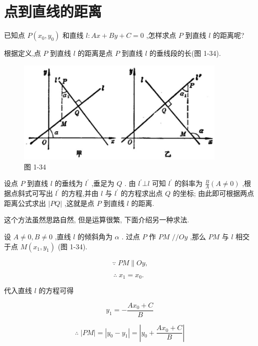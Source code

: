 \documentclass[lang=cn,newtx,10pt,scheme=chinese]{elegantbook}
\begin{document}
\section{点到直线的距离}

已知点 \(P\left( {{x}_{0},{y}_{0}}\right)\) 和直线 \(l : {Ax} + {By} + C = 0\) ,怎样求点 \(P\) 到直线 \(l\) 的距离呢?

根据定义,点 \(P\) 到直线 \(l\) 的距离是点 \(P\) 到直线 \(l\) 的垂线段的长(图 1-34).

\begin{figure}[h]
  \centering
  \includegraphics[max width=0.9\textwidth]{images/01912cc2-ffb6-728e-9ae7-b113ff05c64b_54_863018.jpg}
  \caption{图 1-34}
\end{figure}



设点 \(P\) 到直线 \(l\) 的垂线为 \({l}^{\prime }\) ,垂足为 \(Q\) . 由 \({l}^{\prime } \bot l\) 可知 \({l}^{\prime }\) 的斜率为 \(\frac{B}{A}\left( {A \neq 0}\right)\) ,根据点斜式可写出 \({l}^{\prime }\) 的方程,并由 \(l\) 与 \({l}^{\prime }\) 的方程求出点 \(Q\) 的坐标; 由此即可根据两点距离公式求出 \(\left| {PQ}\right|\) ,这就是点 \(P\) 到直线 \(l\) 的距离.

这个方法虽然思路自然, 但是运算很繁, 下面介绍另一种求法.

设 \(A \neq 0,B \neq 0\) ,直线 \(l\) 的倾斜角为 \(\alpha\) . 过点 \(P\) 作 \({PM}\) \(//{Oy}\) ,那么 \({PM}\) 与 \(l\) 相交于点 \(M\left( {{x}_{1},{y}_{1}}\right)\) (图 1-34).

\[
  \because \;{PM}\parallel {Oy}\text{,}
\]

\[
  \therefore \;{x}_{1} = {x}_{0}\text{. }
\]

代入直线 \(l\) 的方程可得

\[
    {y}_{1} = - \frac{A{x}_{0} + C}{B}
\]

\[
  \therefore \;\left| {PM}\right| = \left| {{y}_{0} - {y}_{1}}\right| = \left| {{y}_{0} + \frac{A{x}_{0} + C}{B}}\right|
\]
\end{document}
